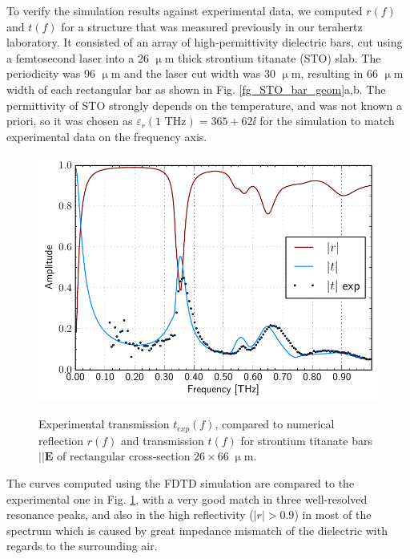 To verify the simulation results against experimental data, we computed $r(f)$ and $t(f)$ for a structure that was measured previously in our terahertz laboratory. %
It consisted of an array of high-permittivity dielectric bars, cut using a femtosecond laser into a 26 $\upmu$m thick strontium titanate (STO) slab. The periodicity was 96 $\upmu$m and the laser cut width was 30 $\upmu$m, resulting in 66 $\upmu$m width of each rectangular bar as shown in Fig. \ref{fg_STO_bar_geom}a,b. The permittivity of STO strongly depends on the temperature, and was not known a priori, so it was chosen as $\varepsilon_r(1\text{ THz}) = 365 + 62\ii$ for the simulation to match experimental data on the frequency axis.
\begin{figure} \caption{Experimental transmission $t_{exp}(f)$, compared to numerical reflection $r(f)$ and transmission $t(f)$ for strontium titanate bars $||\mathbf E$ of rectangular cross-section $26 \times 66\;\upmu$m. }  \centering \includegraphics[width=12cm]{img/STObar_rt.pdf} \label{fg_STO_bar_rt} \end{figure} 
The curves computed using the FDTD simulation are compared to the experimental one in Fig. \ref{fg_STO_bar_rt}, with a very good match in three well-resolved resonance peaks, and also in the high reflectivity ($|r| > 0.9$) in most of the spectrum which is caused by great impedance mismatch of the dielectric with regards to the surrounding air.

